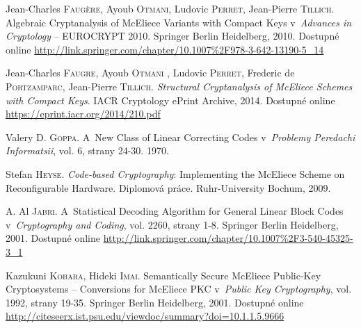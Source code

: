\documentclass[thesis=M,czech,hidelinks]{FITthesis}[2012/06/26]
\newcommand{\0}{{\textcolor[gray]{0.75}{0}}}
\begin{document}
\begin{thebibliography}{99}
        Jean-Charles \textsc{Faugère}, Ayoub \textsc{Otmani}, Ludovic
        \textsc{Perret}, Jean-Pierre \textsc{Tillich}. Algebraic Cryptanalysis
        of McEliece Variants with Compact Keys v~\emph{Advances in Cryptology}
        -- EUROCRYPT 2010. Springer Berlin Heidelberg, 2010. Dostupné online
        \url{http://link.springer.com/chapter/10.1007\%2F978-3-642-13190-5\_14}

        Jean-Charles \textsc{Faugre}, Ayoub \textsc{Otmani} , Ludovic
        \textsc{Perret}, Frederic de \textsc{Portzamparc}, Jean-Pierre
        \textsc{Tillich}. \emph{Structural Cryptanalysis of McEliece Schemes
        with Compact Keys}. IACR Cryptology ePrint Archive, 2014. Dostupné
        online \url{https://eprint.iacr.org/2014/210.pdf}

%

        Valery D. \textsc{Goppa}. A~New Class of Linear Correcting Codes
        v~\emph{Problemy Peredachi Informatsii}, vol. 6, strany 24-30. 1970.

        Stefan \textsc{Heyse}. \emph{Code-based Cryptography}: Implementing the
        McEliece Scheme on Reconfigurable Hardware. Diplomová práce.
        Ruhr-University Bochum, 2009.

        A. Al \textsc{Jabri}. A~Statistical Decoding Algorithm for General
        Linear Block Codes v~\emph{Cryptography and Coding}, vol. 2260, strany
        1-8. Springer Berlin Heidelberg, 2001. Dostupné online
        \url{http://link.springer.com/chapter/10.1007\%2F3-540-45325-3\_1}

        Kazukuni \textsc{Kobara}, Hideki \textsc{Imai}. Semantically Secure
        McEliece Public-Key Cryptosystems -- Conversions for McEliece PKC
        v~\emph{Public Key Cryptography}, vol. 1992, strany 19-35. Springer
        Berlin Heidelberg, 2001. Dostupné online
        \url{http://citeseerx.ist.psu.edu/viewdoc/summary?doi=10.1.1.5.9666}


\end{thebibliography}
\end{document}
